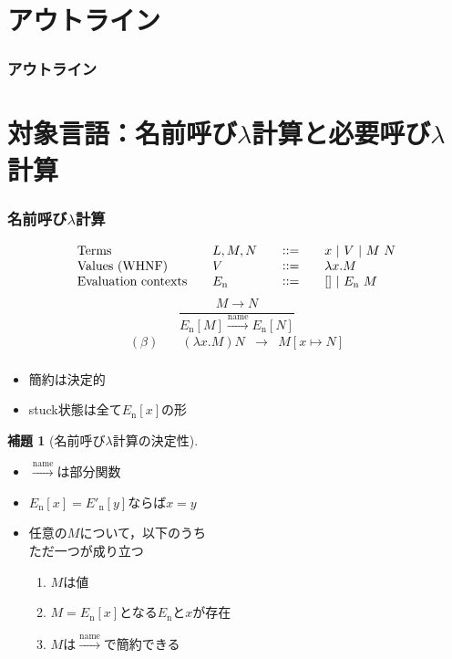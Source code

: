 \documentclass[dvipdfmx,cjk,xcolor=dvipsnames,envcountsect,notheorems,12pt]{beamer}
\theoremstyle{definition}
\newtheorem{lemma}{補題}
\newcommand{\CALLBYNAME}{\xrightarrow{\mathrm{name}}}
\begin{document}
\section*{アウトライン}
\begin{frame}
  \frametitle{アウトライン}
  \tableofcontents[sectionstyle=show,subsectionstyle=hide]
\end{frame}

\section{対象言語：名前呼び$\lambda$計算と必要呼び$\lambda$計算}

\begin{frame}
	\frametitle{名前呼び$\lambda$計算}
	\large
	\[ \begin{array}{llcl}
		\mbox{Terms}\quad & L,M,N\quad & \vcentcolon\vcentcolon=\quad & x~|~V~|~M~N \\
		\mbox{Values (WHNF)}\quad & V\quad & \vcentcolon\vcentcolon=\quad & \lambda x.M \\
		\mbox{Evaluation contexts}\quad & E_\mathrm{n}\quad & \vcentcolon\vcentcolon=\quad & [] ~|~ E_\mathrm{n}~M \\
	\end{array} \]
	\[\frac{M \rightarrow N}{E_\mathrm{n}[M] \CALLBYNAME E_\mathrm{n}[N]}\]
	\vfill
	\[ \begin{array}{lrcl}
		(\beta)\quad & (\lambda x.M)N & \rightarrow & M[x \mapsto N] \\
	\end{array} \]
	\begin{itemize}
		\item 簡約は決定的
		\item stuck状態は全て$E_\mathrm{n}[x]$の形
	\end{itemize}
\end{frame}

\begin{frame}
	\begin{lemma}[名前呼び$\lambda$計算の決定性]
	\begin{itemize}
		\item $\CALLBYNAME$は部分関数
		\item $E_\mathrm{n}[x]=E'_\mathrm{n}[y]$ならば$x=y$
		\item 任意の$M$について，以下のうち\\\alert{ただ一つ}が成り立つ
			\begin{enumerate}
				\item $M$は値
				\item $M=E_\mathrm{n}[x]$となる$E_\mathrm{n}$と$x$が存在
				\item $M$は$\CALLBYNAME$で簡約できる
			\end{enumerate}
	\end{itemize}
	\end{lemma}
\end{frame}
\end{document}
